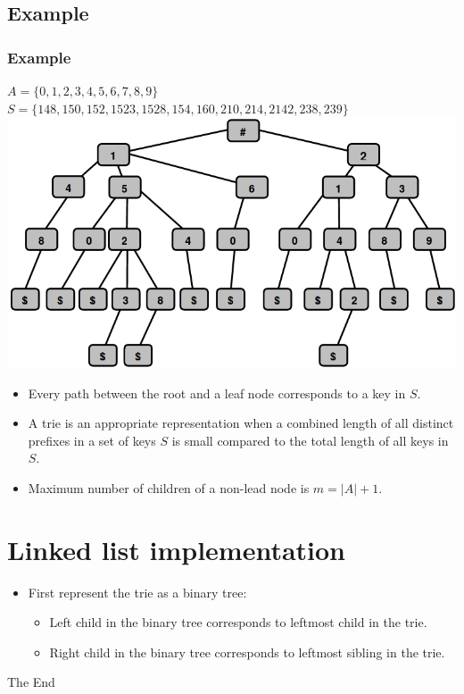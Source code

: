\documentclass{beamer}
\begin{document}
\subsection{Example}
\begin{frame}
\frametitle{Example}
$A = \{
0
,
1
,
2
,
3
,
4
,
5
,
6
,
7
,
8
,
9
\}$\\
$S = \{
148
,
150
,
152
,
1523
,
1528
,
154
,
160
,
210
,
214
,
2142
,
238
,
239
\}$
\includegraphics[scale=0.25]{example.png}
\begin{itemize}
\item Every path between the root and a leaf node corresponds to a key in $S$.
\item A trie is an appropriate representation when a combined length of all distinct prefixes in a set of keys $S$ is small compared to the total length of all keys in $S$.
\item Maximum number of children of a non-lead node is $m = |A| + 1$.
\end{itemize}
\end{frame}
\section{Linked list implementation}
\begin{frame}
\begin{itemize}
\item First represent the trie as a binary tree:
\begin{itemize}
\item Left child in the binary tree corresponds to leftmost child in the trie.
\item Right child in the binary tree corresponds to leftmost sibling in the trie.
\end{itemize}

\end{itemize}
\end{frame}


\begin{frame} 
\Huge{\centerline{The End}}
\end{frame}
\end{document}
